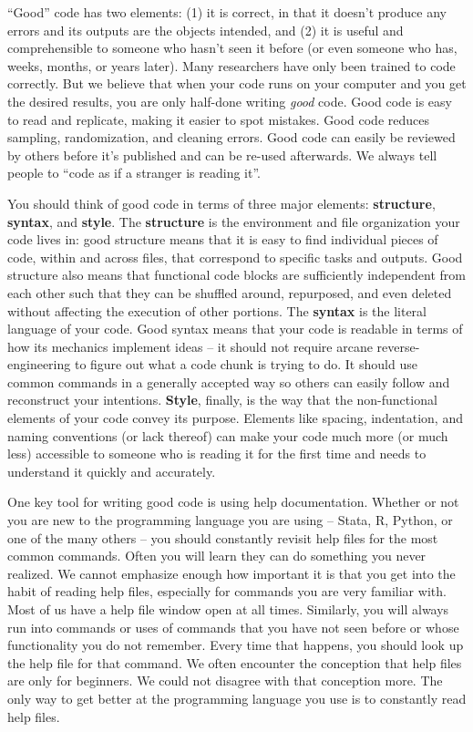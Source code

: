 ``Good'' code has two elements: 
(1) it is correct, in that it doesn't produce any errors
and its outputs are the objects intended,
and (2) it is useful and comprehensible 
to someone who hasn't seen it before
(or even someone who has, weeks, months, or years later).
Many researchers have only been trained to code correctly.
But we believe that when your code runs on your computer 
and you get the desired results,
you are only half-done writing \textit{good} code.
Good code is easy to read and replicate, 
making it easier to spot mistakes.
Good code reduces sampling, randomization, and cleaning errors.
Good code can easily be reviewed by others 
before it's published and can be re-used afterwards.
We always tell people to ``code as if a stranger is reading it''.

You should think of good code in terms of three major elements:
\textbf{structure}, \textbf{syntax}, and \textbf{style}.
The \textbf{structure} is the environment 
and file organization your code lives in:
good structure means that it is easy to find individual pieces of code,
within and across files,
that correspond to specific tasks and outputs.
Good structure also means that functional code blocks 
are sufficiently independent from each other
such that they can be shuffled around, repurposed, 
and even deleted without affecting the execution of other portions.
The \textbf{syntax} is the literal language of your code.
Good syntax means that your code is readable
in terms of how its mechanics implement ideas --
it should not require arcane reverse-engineering
to figure out what a code chunk is trying to do.
It should use common commands in a generally accepted way
so others can easily follow and reconstruct your intentions.
\textbf{Style}, finally, is the way 
that the non-functional elements of your code convey its purpose.
Elements like spacing, indentation, 
and naming conventions (or lack thereof) 
can make your code much more
(or much less) accessible to someone 
who is reading it for the first time
and needs to understand it quickly and accurately.

One key tool for writing good code is using help documentation.
Whether or not you are new to the programming language you are using 
-- Stata, R, Python, or one of the many others --
you should constantly revisit help files for the most common commands.
Often you will learn they can do something you never realized.
We cannot emphasize enough how important it is
that you get into the habit of reading help files,
especially for commands you are very familiar with.
Most of us have a help file window open at all times.
Similarly, you will always run into commands or uses of commands that
you have not seen before or whose functionality you do not remember.
Every time that happens,
you should look up the help file for that command.
We often encounter the conception that help files are only for beginners.
We could not disagree with that conception more.
The only way to get better at the programming language you use
is to constantly read help files.

